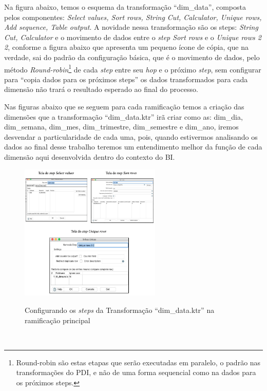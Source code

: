 Na figura abaixo, temos o esquema da transforma\c{c}\~{a}o ``dim\_data'', composta pelos componentes: 
\textit{Select values, Sort rows, String Cut, Calculator, Unique rows, Add sequence, Table output}. 
A novidade nessa transforma\c{c}\~{a}o s\~{a}o os steps: \textit{String Cut, Calculator} e o movimento de dados 
entre o \textit{step Sort rows} e o \textit{Unique rows 2 2}, conforme a figura abaixo que apresenta um 
pequeno \'{i}cone de c\'{o}pia, que na verdade, sai do padr\~{a}o da configura\c{c}\~{a}o b\'{a}sica, que \'{e} o movimento
de dados, pelo m\'{e}todo \textit{Round-robin}\footnote{Round-robin s\~{a}o estas etapas que ser\~{a}o 
executadas em paralelo, o padr\~{a}o nas transforma\c{c}\~{o}es do PDI, e n\~{a}o de uma forma sequencial como na dados para os pr\'{o}ximos steps. 
} de cada \textit{step} entre seu \textit{hop} e o pr\'{o}ximo \textit{step}, sem configurar para ``copia dados para os pr\'{o}ximos steps'' 
os dados transformados para cada dimens\~{a}o n\~{a}o trar\'{a} o resultado esperado ao final do processo.

Nas figuras abaixo que se seguem para cada ramifica\c{c}\~{a}o temos a cria\c{c}\~{a}o das dimens\~{o}es que a transforma\c{c}\~{a}o 
``dim\_data.ktr'' ir\~{a} criar como as: dim\_dia, dim\_semana, dim\_mes, dim\_trimestre, 
dim\_semestre e dim\_ano, iremos desvendar a particularidade de cada uma, 
pois, quando estivermos analisando os dados ao final desse trabalho teremos 
um entendimento melhor da fun\c{c}\~{a}o de cada dimens\~{a}o aqui desenvolvida dentro do contexto do BI.

\begin{figure}[H]
	\vspace*{0,2cm}
    \centering
    \caption{Configurando os \textit{steps} da Transforma\c{c}\~{a}o ``dim\_data.ktr'' na ramifica\c{c}\~{a}o principal}
    \includegraphics[width=0.6\textwidth]{./04-figuras/figura-dim-data-steps.png}
    \label{fig:ilustfigdimdatasteps}
\end{figure}
\vspace*{-0,9cm}
{\raggedright {}} \\


